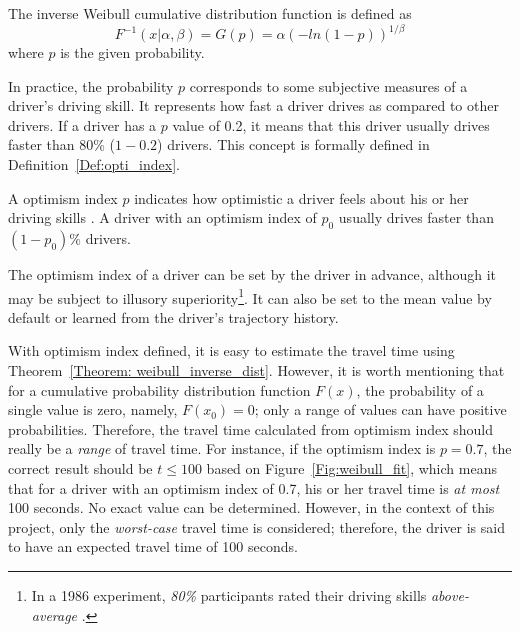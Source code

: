 \begin{theorem}\label{Theorem: weibull_inverse_dist}
The inverse Weibull cumulative distribution function is defined as
\begin{equation}
F^{-1}(x | \alpha, \beta) = G(p) = \alpha(-ln(1 - p)) ^ {1/\beta}
\end{equation}
where $p$ is the given probability.
\end{theorem}

In practice, the probability $p$ corresponds to some subjective measures of a driver's driving skill. It represents how fast a driver drives as compared to other drivers. If a driver has a $p$ value of 0.2, it means that this driver usually drives faster than 80\% ($1 - 0.2$) drivers. This concept is formally defined in Definition~\ref{Def:opti_index}.

\begin{defn}\label{Def:opti_index}
A optimism index $p$ indicates how optimistic a driver feels about his or her driving skills \cite{TDR10}. A driver with an optimism index of $p_{0}$ usually drives faster than $(1 - p_{0})\%$ drivers. 
\end{defn}

The optimism index of a driver can be set by the driver in advance, although it may be subject to illusory superiority\footnote{In a 1986 experiment, \emph{80\%} participants rated their driving skills \emph{above-average} \cite{IFD86}.}. It can also be set to the mean value by default or learned from the driver's trajectory history. 

With optimism index defined, it is easy to estimate the travel time using Theorem~\ref{Theorem: weibull_inverse_dist}. However, it is worth mentioning that for a cumulative probability distribution function $F(x)$, the probability of a single value is zero, namely, $F(x_{0}) = 0$; only a range of values can have positive probabilities. Therefore, the travel time calculated from optimism index should really be a \emph{range} of travel time. For instance, if the optimism index is $p = 0.7$, the correct result should be $t \leq 100$ based on Figure~\ref{Fig:weibull_fit}, which means that for a driver with an optimism index of 0.7, his or her travel time is \emph{at most} 100 seconds. No exact value can be determined. However, in the context of this project, only the \emph{worst-case} travel time is considered; therefore, the driver is said to have an expected travel time of 100 seconds. 


